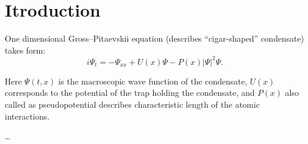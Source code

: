 
\chapter*{Itroduction}

One dimensional Gross--Pitaevskii equation (describes ``cigar-shaped'' condensate) takes form:
\begin{equation}
	i \Psi_t = -\Psi_{xx} + U(x) \Psi - P(x) |\Psi|^2 \Psi.
\label{eq:gross-pitaevskii}
\end{equation}

Here $\Psi(t, x)$ is the macroscopic wave function of the condensate, $U(x)$ corresponds to the potential of the trap holding the condensate, and $P(x)$ also called as pseudopotential describes characteristic length of the atomic interactions.

\dots

